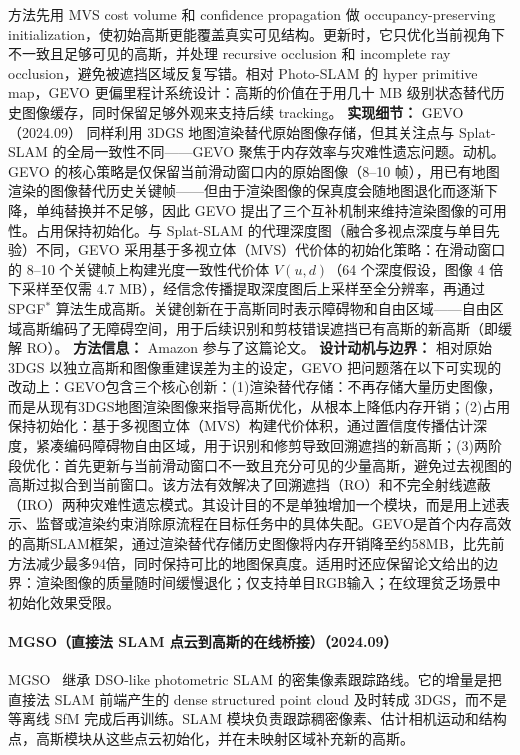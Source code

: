 方法先用 MVS cost volume 和 confidence propagation 做 occupancy-preserving initialization，使初始高斯更能覆盖真实可见结构。更新时，它只优化当前视角下不一致且足够可见的高斯，并处理 recursive occlusion 和 incomplete ray occlusion，避免被遮挡区域反复写错。相对 Photo-SLAM 的 hyper primitive map，GEVO 更偏里程计系统设计：高斯的价值在于用几十 MB 级别状态替代历史图像缓存，同时保留足够外观来支持后续 tracking。
\textbf{实现细节：} GEVO（2024.09） 同样利用 3DGS 地图渲染替代原始图像存储，但其关注点与 Splat-SLAM 的全局一致性不同——GEVO 聚焦于内存效率与灾难性遗忘问题。动机。GEVO 的核心策略是仅保留当前滑动窗口内的原始图像（8--10 帧），用已有地图渲染的图像替代历史关键帧——但由于渲染图像的保真度会随地图退化而逐渐下降，单纯替换并不足够，因此 GEVO 提出了三个互补机制来维持渲染图像的可用性。占用保持初始化。与 Splat-SLAM 的代理深度图（融合多视点深度与单目先验）不同，GEVO 采用基于多视立体（MVS）代价体的初始化策略：在滑动窗口的 8--10 个关键帧上构建光度一致性代价体 $V(u,d)$（64 个深度假设，图像 4 倍下采样至仅需 4.7 MB），经信念传播提取深度图后上采样至全分辨率，再通过 SPGF$^{*}$ 算法生成高斯。关键创新在于高斯同时表示障碍物和自由区域——自由区域高斯编码了无障碍空间，用于后续识别和剪枝错误遮挡已有高斯的新高斯（即缓解 RO）。
\textbf{方法信息：} Amazon 参与了这篇论文。
\textbf{设计动机与边界：} 相对原始 3DGS 以独立高斯和图像重建误差为主的设定，GEVO 把问题落在以下可实现的改动上：GEVO包含三个核心创新：(1)渲染替代存储：不再存储大量历史图像，而是从现有3DGS地图渲染图像来指导高斯优化，从根本上降低内存开销；(2)占用保持初始化：基于多视图立体（MVS）构建代价体积，通过置信度传播估计深度，紧凑编码障碍物自由区域，用于识别和修剪导致回溯遮挡的新高斯；(3)两阶段优化：首先更新与当前滑动窗口不一致且充分可见的少量高斯，避免过去视图的高斯过拟合到当前窗口。该方法有效解决了回溯遮挡（RO）和不完全射线遮蔽（IRO）两种灾难性遗忘模式。其设计目的不是单独增加一个模块，而是用上述表示、监督或渲染约束消除原流程在目标任务中的具体失配。GEVO是首个内存高效的高斯SLAM框架，通过渲染替代存储历史图像将内存开销降至约58MB，比先前方法减少最多94倍，同时保持可比的地图保真度。适用时还应保留论文给出的边界：渲染图像的质量随时间缓慢退化；仅支持单目RGB输入；在纹理贫乏场景中初始化效果受限。
\paragraph{MGSO（直接法 SLAM 点云到高斯的在线桥接）（2024.09）}
MGSO~\cite{2409_13055} 继承 DSO-like photometric SLAM 的密集像素跟踪路线。它的增量是把直接法 SLAM 前端产生的 dense structured point cloud 及时转成 3DGS，而不是等离线 SfM 完成后再训练。SLAM 模块负责跟踪稠密像素、估计相机运动和结构点，高斯模块从这些点云初始化，并在未映射区域补充新的高斯。

